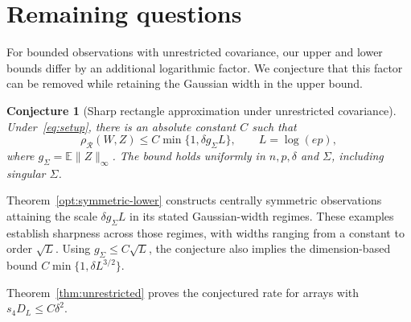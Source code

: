 \documentclass[11pt,letterpaper,twoside,leqno]{article}
\theoremstyle{bookplain}
\newtheorem{conjecture}{Conjecture}
\theoremstyle{bookremark}
\newcommand{\E}{\mathbb E}
\newcommand{\rh}{\rho_{\mathcal R}}
\begin{document}
\section{Remaining questions}\label{sec:discussion}

For bounded observations with unrestricted covariance, our upper and
lower bounds differ by an additional logarithmic factor. We conjecture
that this factor can be removed while retaining the Gaussian width
in the upper bound.
\begin{conjecture}[Sharp rectangle approximation under unrestricted covariance]
\label{conj:sharp-unrestricted}
Under~\eqref{eq:setup}, there is an absolute constant \(C\) such that
\[
 \rh(W,Z)\le C\min\{1,\delta g_\Sigma L\},\qquad L=\log(ep),
\]
where $g_\Sigma=\E\|Z\|_\infty$. The bound holds uniformly in
$n,p,\delta$ and $\Sigma$, including singular $\Sigma$.
\end{conjecture}

Theorem~\ref{opt:symmetric-lower} constructs centrally symmetric
observations attaining the scale $\delta g_\Sigma L$ in its stated
Gaussian-width regimes. These examples establish sharpness across
those regimes, with widths ranging from a constant to order $\sqrt L$.
Using $g_\Sigma\le C\sqrt L$, the conjecture also implies the
dimension-based bound $C\min\{1,\delta L^{3/2}\}$.


Theorem~\ref{thm:unrestricted} proves the conjectured rate for arrays with ${s_4D_L\le C\delta^2}$.
\end{document}
